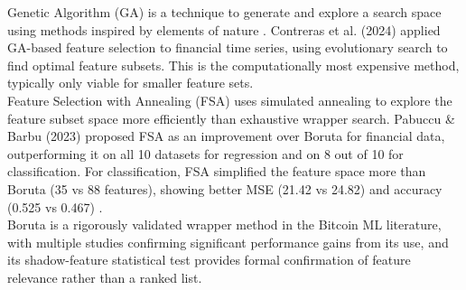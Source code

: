 Genetic Algorithm (GA) is a technique to generate and explore a search space using methods inspired by elements of nature \cite{contrerasGeneticAlgorithmFeature2024}. Contreras et al. (2024) applied GA-based feature selection to financial time series, using evolutionary search to find optimal feature subsets. This is the computationally most expensive method, typically only viable for smaller feature sets.\\
Feature Selection with Annealing (FSA) uses simulated annealing to explore the feature subset space more efficiently than exhaustive wrapper search. Pabuccu \& Barbu (2023) proposed FSA as an improvement over Boruta for financial data, outperforming it on all 10 datasets for regression and on 8 out of 10 for classification. For classification, FSA simplified the feature space more than Boruta (35 vs 88 features), showing better MSE (21.42 vs 24.82) and accuracy (0.525 vs 0.467) \cite{pabuccuFeatureSelectionAnnealing2024}.\\
Boruta is a rigorously validated wrapper method in the Bitcoin ML literature, with multiple studies confirming significant performance gains from its use, and its shadow-feature statistical test provides formal confirmation of feature relevance rather than a ranked list.
